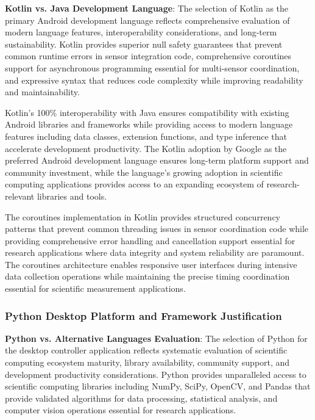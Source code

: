 \documentclass[12pt,a4paper]{report}
\begin{document}
\textbf{Kotlin vs. Java Development Language}: The selection of Kotlin as the primary Android development language reflects
comprehensive evaluation of modern language features, interoperability considerations, and long-term sustainability.
Kotlin provides superior null safety guarantees that prevent common runtime errors in sensor integration code,
comprehensive coroutines support for asynchronous programming essential for multi-sensor coordination, and expressive
syntax that reduces code complexity while improving readability and maintainability.

Kotlin's 100\% interoperability with Java ensures compatibility with existing Android libraries and frameworks while
providing access to modern language features including data classes, extension functions, and type inference that
accelerate development productivity. The Kotlin adoption by Google as the preferred Android development language ensures
long-term platform support and community investment, while the language's growing adoption in scientific computing
applications provides access to an expanding ecosystem of research-relevant libraries and tools.

The coroutines implementation in Kotlin provides structured concurrency patterns that prevent common threading issues in
sensor coordination code while providing comprehensive error handling and cancellation support essential for research
applications where data integrity and system reliability are paramount. The coroutines architecture enables responsive
user interfaces during intensive data collection operations while maintaining the precise timing coordination essential
for scientific measurement applications.

\subsubsection{Python Desktop Platform and Framework Justification}

\textbf{Python vs. Alternative Languages Evaluation}: The selection of Python for the desktop controller application reflects
systematic evaluation of scientific computing ecosystem maturity, library availability, community support, and
development productivity considerations. Python provides unparalleled access to scientific computing libraries including
NumPy, SciPy, OpenCV, and Pandas that provide validated algorithms for data processing, statistical analysis, and
computer vision operations essential for research applications.
\end{document}
